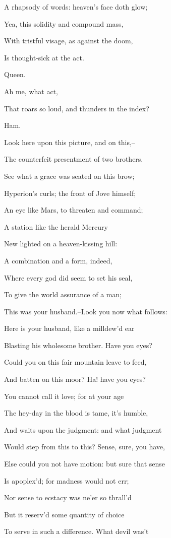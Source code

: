 \documentclass[12pt]{book}
\begin{document}
A rhapsody of words: heaven's face doth glow;

Yea, this solidity and compound mass,

With tristful visage, as against the doom,

Is thought-sick at the act.



Queen.

Ah me, what act,

That roars so loud, and thunders in the index?



Ham.

Look here upon this picture, and on this,--

The counterfeit presentment of two brothers.

See what a grace was seated on this brow;

Hyperion's curls; the front of Jove himself;

An eye like Mars, to threaten and command;

A station like the herald Mercury

New lighted on a heaven-kissing hill:

A combination and a form, indeed,

Where every god did seem to set his seal,

To give the world assurance of a man;

This was your husband.--Look you now what follows:

Here is your husband, like a milldew'd ear

Blasting his wholesome brother. Have you eyes?

Could you on this fair mountain leave to feed,

And batten on this moor? Ha! have you eyes?

You cannot call it love; for at your age

The hey-day in the blood is tame, it's humble,

And waits upon the judgment: and what judgment

Would step from this to this? Sense, sure, you have,

Else could you not have motion: but sure that sense

Is apoplex'd; for madness would not err;

Nor sense to ecstacy was ne'er so thrall'd

But it reserv'd some quantity of choice

To serve in such a difference. What devil was't
\end{document}
